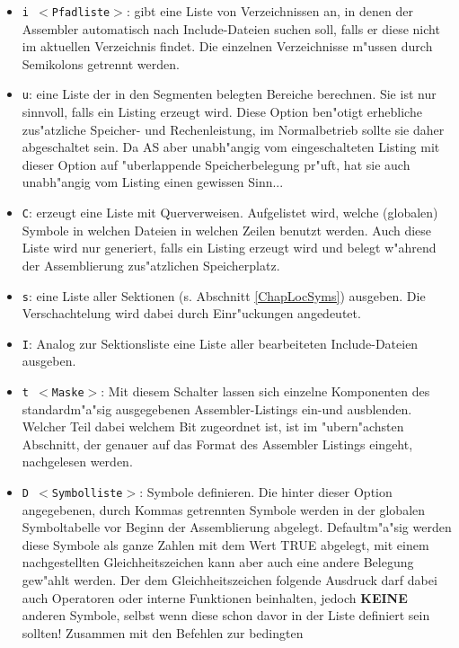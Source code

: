 \documentclass[12pt,a4paper,twoside]{report}
\newcommand{\bb}[1]{{\bf #1}}
\newcommand{\tty}[1]{{\tt #1}}
\begin{document}
\begin{itemize}
{      Geschmacks.}
\item{\tty{i $<$Pfadliste$>$}: gibt eine Liste von Verzeichnissen an, in denen
      der Assembler automatisch nach Include-Dateien suchen soll, falls
      er diese nicht im aktuellen Verzeichnis findet. Die einzelnen
      Verzeichnisse m"ussen durch Semikolons getrennt werden.}
\item{\tty{u}: eine Liste der in den Segmenten belegten Bereiche berechnen.
      Sie ist nur sinnvoll, falls ein Listing erzeugt
      wird.  Diese Option ben"otigt erhebliche zus"atzliche Speicher-
      und Rechenleistung, im Normalbetrieb sollte sie daher abgeschaltet
      sein.  Da AS aber unabh"angig vom eingeschalteten Listing mit dieser
      Option auf "uberlappende Speicherbelegung pr"uft, hat sie auch
      unabh"angig vom Listing einen gewissen Sinn...}
\item{\tty{C}: erzeugt eine Liste mit Querverweisen.  Aufgelistet wird,
      welche (globalen) Symbole in welchen Dateien in welchen Zeilen
      benutzt werden.  Auch diese Liste wird nur generiert, falls
      ein Listing erzeugt wird und belegt w"ahrend der
      Assemblierung zus"atzlichen Speicherplatz.}
\item{\tty{s}: eine Liste aller Sektionen (s. Abschnitt \ref{ChapLocSyms})
      ausgeben.  Die Verschachtelung wird dabei durch Einr"uckungen
      angedeutet.}
\item{\tty{I}: Analog zur Sektionsliste eine Liste aller bearbeiteten
      Include-Dateien ausgeben.}
\item{\tty{t $<$Maske$>$}: Mit diesem Schalter lassen sich einzelne Komponenten
      des standardm"a"sig ausgegebenen Assembler-Listings ein-und ausblenden.
      Welcher Teil dabei welchem Bit zugeordnet ist, ist im "ubern"achsten
      Abschnitt, der genauer auf das Format des Assembler Listings eingeht,
      nachgelesen werden.}
\item{\tty{D $<$Symbolliste$>$}: Symbole definieren. Die hinter dieser Option
      angegebenen, durch Kommas getrennten Symbole werden in der
      globalen Symboltabelle vor Beginn der Assemblierung abgelegt.
      Defaultm"a"sig werden diese Symbole als ganze Zahlen mit dem
      Wert TRUE abgelegt, mit einem nachgestellten Gleichheitszeichen
      kann aber auch eine andere Belegung gew"ahlt werden.  Der dem
      Gleichheitszeichen folgende Ausdruck darf dabei auch Operatoren
      oder interne Funktionen beinhalten, jedoch \bb{KEINE} anderen
      Symbole, selbst wenn diese schon davor in der Liste definiert
      sein sollten!  Zusammen mit den Befehlen zur bedingten
}
\end{itemize}
\end{document}
